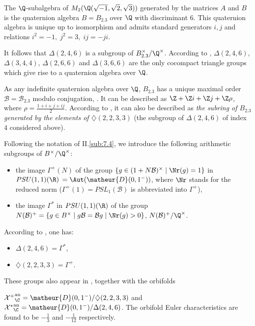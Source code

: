 \begin{para}\label{para::6.2.1} The $\Q$-subalgebra of $M_2(\Q (\sqrt
 {-1}, \sqrt 2, \sqrt 3))$ generated by the matrices $A$ and $B$ 
 is the quaternion algebra $B=B_{2.3}$ over $\Q$ with discriminant
 $6$. This quaternion algebra is unique up to 
 isomorphism and admits standard generators $i,j$ and relations 
 $i^2=-1,\;j^2=3,\;ij=-ji$.  

 \noindent It follows that $\Delta(2,4,6)$ is a subgroup of
 $B_{2.3}^\times/\Q^\times$. According to \cite{ccoatg}, 
 $\Delta(2,4,6)$, $\Delta(3,4,4)$, $\Delta(2,6,6)$ and $\Delta(3,6,6)$
 are the only cocompact triangle 
 groups which give rise to a quaternion algebra over $\Q$. 

 \noindent As any indefinite quaternion algebra over $\Q$, $B_{2.3}$ has
 a unique maximal order $\mathcal{B}=\mathcal{B}_{2.3}$ 
 modulo conjugation, \cf \cite[p.99]{adadq}. It can be described
 as $\Z  + \Z i + \Z j + \Z \rho$, where 
 $\rho =\frac{1+i+j+ij}{2}$. According to \cite{ccoatg}, it can also be
 described as {\it the subring of 
 $B_{2.3}$ generated by the elements of $\diamondsuit (2,2,3,3)$} (the
 subgroup of $\Delta(2,4,6)$ of index $4$ 
 considered above). 

 Following the notation of  II.\ref{sub:7.4}, we introduce the following
 arithmetic subgroups of $B^\times/\Q^\times$:

\begin{itemize}
 \item the image $\Gamma^+(N)$ of the group $\{g\in
       (1+N\mathcal{B})^\times \mid \Nr(g)=1\}$ in 
       $PSU(1,1)(\R)$ $=\Aut(\matheur{D}(0,1^-))$, where $\Nr$ stands for the
       reduced norm ($\Gamma^+(1)=PSL_1(\mathcal{B})$ is abbreviated
       into $\Gamma^+$),
 \item the image $\Gamma^\ast$ in $PSU(1,1)(\R)$ of the group 
       $N(\mathcal{B})^+=\{g\in B^\times\mid
       g\mathcal{B}=\mathcal{B}g \mid \Nr(g)>0\}$, \ie 
       $N(\mathcal{B})^+/\Q^\times$. 
\end{itemize}
       
\medskip According to \cite{ccoatg}, one has: 
 
\begin{itemize}
 \item $\Delta(2,4,6)=\Gamma^\ast$, 
 \item $\diamondsuit (2,2,3,3)=\Gamma^+$.
\end{itemize}

These groups also appear in \cite[p.122]{adadq}, together
with the orbifolds

\noindent ${\mathcal{X}^+}_\C^{\mathrm{an}}= \matheur{D}(0,1^-)/\diamondsuit 
 (2,2,3,3)$ and ${\mathcal{X}^\ast}_\C^{\mathrm{an}}=\matheur{D}(0,1^-)/\Delta(2,4,6)$.
 The orbifold Euler characteristics are found to be $-\frac{1}{3}$ and 
 $-\frac{1}{12}$ respectively.  
\end{para}

